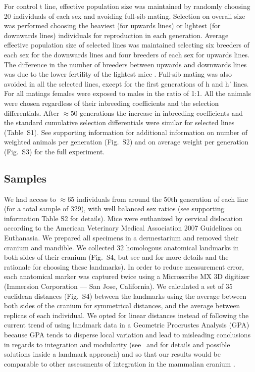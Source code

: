 \begin{refsection}
For control t line, effective population size was maintained by randomly
choosing 20 individuals of each sex and avoiding full-sib mating.
Selection on overall size was performed choosing the heaviest (for
upwards lines) or lightest (for downwards lines) individuals for
reproduction in each generation. Average effective population size of
selected lines was maintained selecting six breeders of each sex for the
downwards lines and four breeders of each sex for upwards lines. The
difference in the number of breeders between upwards and downwards lines
was due to the lower fertility of the lightest mice \parencite{Bernardi2009-kv}.
Full-sib mating was also avoided in all the selected lines, except for
the first generations of h and h' lines. For all matings females were
exposed to males in the ratio of 1:1. All the animals were chosen
regardless of their inbreeding coefficients and the selection
differentials. After \(\approx 50\) generations the increase in
inbreeding coefficients and the standard cumulative selection
differentials were similar for selected lines (Table~S1). See supporting
information for additional information on number of weighted animals per
generation (Fig.~S2) and on average weight per generation (Fig.~S3) for
the full experiment.

\subsection{Samples}

We had access to \(\approx 65\) individuals from around the 50th
generation of each line (for a total sample of 329), with well balanced
sex ratios (see supporting information Table S2 for details). Mice were
euthanized by cervical dislocation according to the American Veterinary
Medical Association 2007 Guidelines on Euthanasia. We prepared all
specimens in a dermestarium and removed their cranium and mandible. We
collected 32 homologous anatomical landmarks in both sides of their
cranium (Fig.~S4, but see \textcite{Cheverud1995-fd} and \textcite{Garcia2014-oj} for more
details and the rationale for choosing these landmarks). In order to
reduce measurement error, each anatomical marker was captured twice
using a Microscribe MX 3D digitizer (Immersion Corporation --- San Jose,
California). We calculated a set of 35 euclidean distances (Fig.~S4)
between the landmarks using the average between both sides of the
cranium for symmetrical distances, and the average between replicas of
each individual. We opted for linear distances instead of following the
current trend of using landmark data in a Geometric Procrustes Analysis
(GPA) because GPA tends to disperse local variation and lead to
misleading conclusions in regards to integration and modularity
(see~\textcite{Van_der_Linde2009-yx} and \textcite{Marquez2012-qe} for details and possible
solutions inside a landmark approach) and so that our results would be
comparable to other assessments of integration in the mammalian cranium
\parencite{Porto2009-pi, Porto2013-dc}.


\end{refsection}
